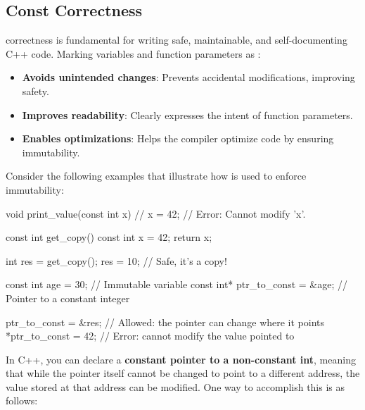 
\subsection{Const Correctness}

\begin{warningblock}
     correctness is fundamental for writing safe, maintainable, and self-documenting C++ code. Marking variables and function parameters as :
    \begin{itemize}
        \item \textbf{Avoids unintended changes}: Prevents accidental modifications, improving safety.
        \item \textbf{Improves readability}: Clearly expresses the intent of function parameters.
        \item \textbf{Enables optimizations}: Helps the compiler optimize code by ensuring immutability.
    \end{itemize}
\end{warningblock}

Consider the following examples that illustrate how  is used to enforce immutability:

\vspace{-0.5em}
\begin{codeblock}[language=C++, numbers=none]
void print_value(const int x) {
    // x = 42; // Error: Cannot modify 'x'.
}

const int get_copy() {
    const int x = 42;
    return x;
}

int res = get_copy();
res = 10; // Safe, it's a copy!

const int age = 30;              // Immutable variable
const int* ptr_to_const = &age;  // Pointer to a constant integer

ptr_to_const = &res;  // Allowed: the pointer can change where it points
*ptr_to_const = 42;   // Error: cannot modify the value pointed to
\end{codeblock}

In C++, you can declare a \textbf{constant pointer to a non-constant int}, meaning that while the pointer itself cannot be changed to point to a different address, the value stored at that address can be modified. One way to accomplish this is as follows:
    
